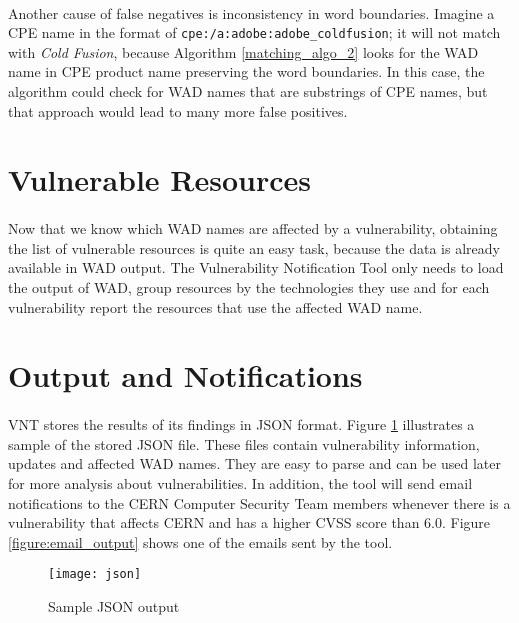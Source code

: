 \paragraph{}
Another cause of false negatives is inconsistency in word boundaries. Imagine a CPE name in the format of \texttt{cpe:/a:adobe:adobe\_coldfusion}; it will not match with \textit{Cold Fusion}, because Algorithm \ref{matching_algo_2} looks for the WAD name in CPE product name preserving the word boundaries. In this case, the algorithm could check for WAD names that are substrings of CPE names, but that approach would lead to many more false positives.

\section{Vulnerable Resources}
\paragraph{}
Now that we know which WAD names are affected by a vulnerability, obtaining the list of vulnerable resources is quite an easy task, because the data is already available in WAD output. The Vulnerability Notification Tool only needs to load the output of WAD, group resources by the technologies they use and for each vulnerability report the resources that use the affected WAD name.
\section{Output and Notifications}
\paragraph{}

VNT stores the results of its findings in JSON format. Figure \ref{figure:json_output} illustrates a sample of the stored JSON file. These files contain vulnerability information, updates and affected WAD names. They are easy to parse and can be used later for more analysis about vulnerabilities.
In addition, the tool will send email notifications to the CERN Computer Security Team members whenever there is a vulnerability that affects CERN and has a higher CVSS score than 6.0. Figure \ref{figure:email_output} shows one of the emails sent by the tool.
\\
\begin{figure}[h!]

  \centering
    \texttt{[image: json]}
  \caption{Sample JSON output}
   \label{figure:json_output}
\end{figure}


